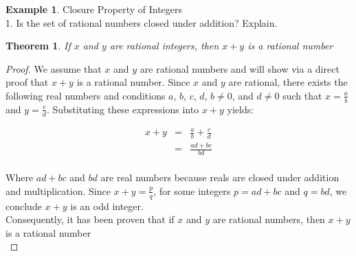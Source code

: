 \documentclass{book}
\newtheorem{theorem}{Theorem}[section]
\theoremstyle{definition}
\newtheorem{example}{Example}[definition]
\theoremstyle{remark}
\begin{document}
\begin{example}
Closure Property of Integers \cite[Chap.1, P.C.1.7, Q.1]{ted} \\

1. Is the set of rational numbers closed under addition? Explain. \\

\begin{tcolorbox}
    \begin{theorem}
        If $x$ and $y$ are rational integers, then $x + y$ is a rational number
    \end{theorem}
\end{tcolorbox}

\begin{proof}
    We assume that $x$ and $y$ are rational numbers and will show via a direct proof that $x + y$ is a rational number. Since $x$ and $y$ are rational, there exists the following real numbers and conditions $a$, $b$, $c$, $d$,  $b \neq 0$, and $d \neq 0$ such that $x = \frac{a}{b}$ and $y = \frac{c}{d}$. Substituting these expressions into $x + y$ yields:
    
    \begin{eqnarray*}
        x + y & = & \frac{a}{b} + \frac{c}{d} \nonumber \\
        & = & \frac{ad + bc}{bd} \nonumber \\
    \end{eqnarray*}
    
    Where $ad + bc$ and $bd$ are real numbers because reals are closed under addition and multiplication. Since $x + y = \frac{p}{q}$, for some integers $p = ad + bc$ and $q = bd$, we conclude $x + y$ is an odd integer. \\
    Consequently, it has been proven that if $x$ and $y$ are rational numbers, then $x + y$ is a rational number \\
\end{proof}
\end{example}
\end{document}
